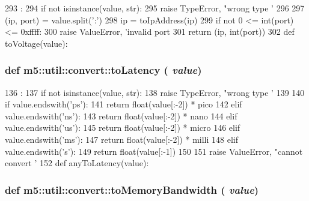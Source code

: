 \begin{DoxyCode}
293                        :
294     if not isinstance(value, str):
295         raise TypeError, "wrong type '%
296 
297     (ip, port) = value.split(':')
298     ip = toIpAddress(ip)
299     if not 0 <= int(port) <= 0xffff:
300         raise ValueError, 'invalid port %
301     return (ip, int(port))
302 
def toVoltage(value):
\end{DoxyCode}
\hypertarget{namespacem5_1_1util_1_1convert_a6ee19bcc8de87fbc62dd420560fc9bcf}{
\subsubsection[{toLatency}]{\setlength{\rightskip}{0pt plus 5cm}def m5::util::convert::toLatency ( {\em value})}}
\label{namespacem5_1_1util_1_1convert_a6ee19bcc8de87fbc62dd420560fc9bcf}



\begin{DoxyCode}
136                     :
137     if not isinstance(value, str):
138         raise TypeError, "wrong type '%
139 
140     if value.endswith('ps'):
141         return float(value[:-2]) * pico
142     elif value.endswith('ns'):
143         return float(value[:-2]) * nano
144     elif value.endswith('us'):
145         return float(value[:-2]) * micro
146     elif value.endswith('ms'):
147         return float(value[:-2]) * milli
148     elif value.endswith('s'):
149         return float(value[:-1])
150 
151     raise ValueError, "cannot convert '%
152 
def anyToLatency(value):
\end{DoxyCode}
\hypertarget{namespacem5_1_1util_1_1convert_aa1a03d449e982c6bcfa243ac67b294af}{
\subsubsection[{toMemoryBandwidth}]{\setlength{\rightskip}{0pt plus 5cm}def m5::util::convert::toMemoryBandwidth ( {\em value})}}
\label{namespacem5_1_1util_1_1convert_aa1a03d449e982c6bcfa243ac67b294af}



